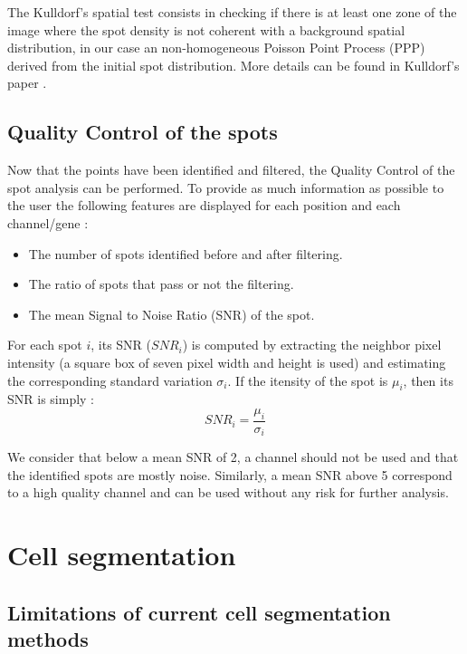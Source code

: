 \documentclass[12pt]{article}
\begin{document}
The Kulldorf's spatial test consists in checking if there is at least one zone of the image where the spot density is not coherent with a background spatial distribution, in our case an non-homogeneous Poisson Point Process (PPP) derived from the initial spot distribution. More details can be found in Kulldorf's paper \citep{kulldorff_spatial_1997}.

\subsection{Quality Control of the spots}

Now that the points have been identified and filtered, the Quality Control of the spot analysis can be performed. To provide as much information as possible to the user the following features are displayed for each position and each channel/gene :
\begin{itemize}
\item The number of spots identified before and after filtering.
\item The ratio of spots that pass or not the filtering.
\item The mean Signal to Noise Ratio (SNR) of the spot.
\end{itemize}

For each spot $i$, its SNR ($SNR_{i}$) is computed by extracting the neighbor pixel intensity (a square box of seven pixel width and height is used) and estimating the corresponding standard variation $\sigma_{i}$. If the itensity of the spot is $\mu_{i}$, then its SNR  is simply :
\begin{equation}
SNR_{i} = \frac{\mu_{i}}{\sigma_{i}}
\end{equation}

We consider that below a mean SNR of 2, a channel should not be used and that the identified spots are mostly noise. Similarly, a mean SNR above 5 correspond to a high quality channel and can be used without any risk for further analysis.


\section{Cell segmentation}

\subsection{Limitations of current cell segmentation methods}
\end{document}
